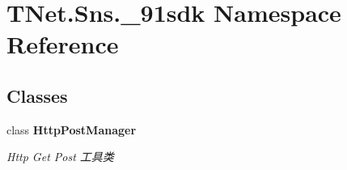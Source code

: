 \hypertarget{namespace_t_net_1_1_sns_1_1__91sdk}{}\section{T\+Net.\+Sns.\+\_\+91sdk Namespace Reference}
\label{namespace_t_net_1_1_sns_1_1__91sdk}
\subsection*{Classes}
\begin{DoxyCompactItemize}
\item 
class {\bfseries Http\+Post\+Manager}
\begin{DoxyCompactList}\small\item\em Http Get Post 工具类 \end{DoxyCompactList}\end{DoxyCompactItemize}
